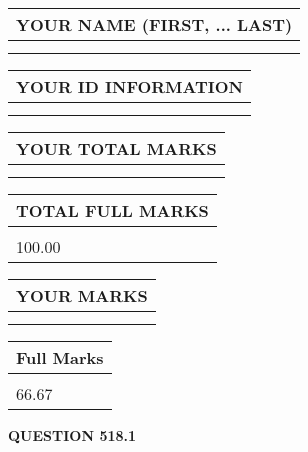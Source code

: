 \documentclass{ctexart}
\begin{document}
   
   
   
\newpage 
\setcounter{page}{ 
   518001 } 
   
   
   
   
\noindent\begin{tabular}{|l|}
\hline
YOUR NAME (FIRST, ... LAST)  \\
\hline
 \\ 
 \\ 
\hline
\end{tabular}
\hspace{0.05in} \begin{tabular}{|l|}
\hline
 YOUR   ID   INFORMATION  \\
\hline
 \\ 
 \\ 
\hline
\end{tabular}
   
   
\vspace{0.2in}\noindent\begin{tabular}{|l|}
\hline
YOUR TOTAL MARKS  \\
\hline
 \\ 
 \\ 
\hline
\end{tabular}
\hspace{0.05in} \begin{tabular}{|l|}
\hline
TOTAL FULL MARKS  \\
\hline
 \\ 
100.00 \\
\hline
\end{tabular}
   
   
 \vspace{0.2in}
 
 
 
 
   
   
  
\vspace{0.2in}
  
\noindent\begin{tabular}{|l|}
\hline
 YOUR MARKS  \\
\hline
 \\ 
 \\ 
\hline
\end{tabular}
\hspace{0.05in} \begin{tabular}{|l|}
\hline
 Full Marks  \\
\hline
 \\ 
66.67 \\
\hline
\end{tabular}
{\textbf{\Large{QUESTION
518.1 
}}}
  
\end{document}
